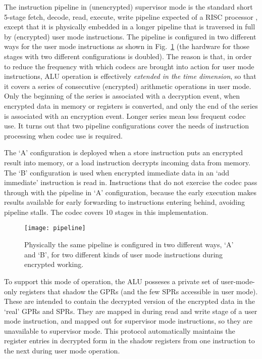 \documentclass[conference]{IEEEtran}
\begin{document}
The instruction pipeline in (unencrypted) supervisor mode is the
standard short 5-stage fetch, decode, read, execute, write pipeline 
expected of a RISC processor \cite{Pat85}, except that it is physically
embedded in a longer pipeline that is traversed in full by (encrypted)
user mode instructions.  The pipeline is configured in two different
ways for the user mode instructions as shown in Fig.~\ref{f:3} (the
hardware for those stages with two different configurations is
doubled).  The reason is that, in order to reduce the frequency with
which codecs are brought into action for user mode instructions, ALU
operation is effectively {\em extended in the time dimension}, so that
it covers a series of consecutive (encrypted) arithmetic operations in
user mode.  Only the beginning of the series is associated with a
decryption event, when encrypted data in memory or registers is converted, and
only the end of the series is associated with an encryption event.
Longer series mean less frequent codec use.  It turns out that two
pipeline configurations cover the needs of instruction processing when
codec use is required.

The `A' configuration is deployed when a store instruction puts an
encrypted result into memory, or a load instruction decrypts incoming
data from memory.  The `B' configuration is used when encrypted
immediate data in an `add immediate' instruction is read in.
Instructions that do not exercise the codec pass through with the
pipeline in `A' configuration, because the early execution makes results
available for early forwarding to instructions entering behind, avoiding
pipeline stalls.  The codec covers 10 stages in this implementation.


\begin{figure}[!t]
\centering
\texttt{[image: pipeline]}
\caption{Physically the same pipeline is configured in two different 
ways, `A' and `B', for two different kinds of user mode instructions
during encrypted working.}
\label{f:3}
\end{figure}

To support this mode of operation, the ALU posseses a private set of
user-mode-only registers that shadow the GPRs (and the few SPRs
accessible in user mode).  These are intended to contain the decrypted
version of the encrypted data in the `real' GPRs and SPRs.  They are
mapped in during read and write stage of a user mode instruction, and
mapped out for supervisor mode instructions, so they are unavailable to
supervisor mode.  This protocol automatically maintains the register
entries in decrypted form in the shadow registers from one instruction
to the next during user mode operation.
\end{document}
